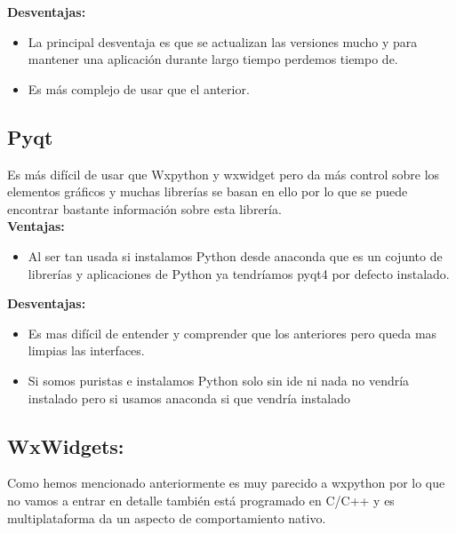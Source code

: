 \textbf{Desventajas:}

\begin{itemize}
\item La principal desventaja es que se actualizan las versiones mucho y para mantener una aplicación durante largo tiempo perdemos tiempo de.
\item Es más complejo de usar que el anterior.
\end{itemize}

\subsection{Pyqt}
Es más difícil de usar que Wxpython y wxwidget pero da más control sobre los elementos gráficos y muchas librerías se basan en ello por lo que se puede encontrar bastante información sobre esta librería.
\\

\textbf{Ventajas:}

\begin{itemize}
\item Al ser tan usada si instalamos Python desde anaconda que es un cojunto de librerías y aplicaciones de Python ya tendríamos pyqt4 por defecto instalado.

\end{itemize}

\textbf{Desventajas:}

\begin{itemize}
\item Es mas difícil de entender y comprender que los anteriores pero queda mas limpias las interfaces.
\item Si somos puristas e instalamos Python solo sin ide ni nada no vendría instalado pero si usamos anaconda si que vendría instalado
\end{itemize}

\subsection{WxWidgets:}
Como hemos mencionado anteriormente es muy parecido a wxpython por lo que no vamos a entrar en detalle también está programado en C/C++ y es multiplataforma da un aspecto de comportamiento nativo.
\\








